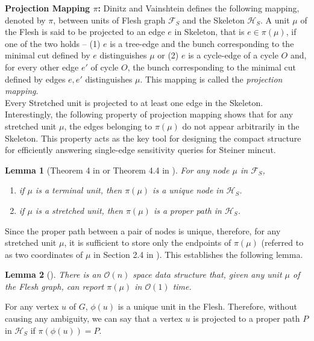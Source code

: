 \documentclass[letterpaper,11pt]{article}
\newtheorem{lemma}{Lemma}[]
\begin{document}
\noindent
\textbf{Projection Mapping $\pi$:} Dinitz and Vainshtein \cite{DBLP:journals/siamcomp/DinitzV00} defines the following mapping, denoted by $\pi$,  between units of Flesh graph ${\mathcal F}_S$ and the Skeleton ${\mathcal H}_S$.
A unit $\mu$ of the Flesh is said to be projected to an edge $e$ in Skeleton, that is $e\in \pi(\mu)$, if one of the two holds -- (1) $e$ is a tree-edge and the bunch corresponding to the minimal cut defined by $e$ distinguishes $\mu$ or (2) $e$ is a cycle-edge of a cycle $O$ and, for every other edge $e'$ of cycle $O$, the bunch corresponding to the minimal cut defined by edges $e,e'$ distinguishes $\mu$.  This mapping is called the \textit{projection mapping}. \\

\noindent
Every Stretched unit is projected to at least one edge in the Skeleton. Interestingly, the following property of projection mapping shows that for any stretched unit $\mu$, the edges belonging to $\pi(\mu)$ do not appear arbitrarily in the Skeleton. This property acts as the key tool for designing the compact structure \cite{DBLP:conf/soda/BaswanaP22} for efficiently answering single-edge sensitivity queries for Steiner mincut.
\begin{lemma} [Theorem 4 in \cite{DBLP:conf/stoc/DinitzV94} or Theorem 4.4 in \cite{DBLP:conf/soda/DinitzV95}] \label{lem : projection mapping of terminal and stretched units}
    For any node $\mu$ in ${\mathcal F}_S$, 
    \begin{enumerate}
        \item if $\mu$ is a terminal unit, then $\pi(\mu)$ is a unique node in ${\mathcal H}_S$. 
        \item if $\mu$ is a stretched unit, then $\pi(\mu)$ is a proper path in  ${\mathcal H}_S$. 
    \end{enumerate} 
\end{lemma}

\noindent
Since the proper path between a pair of nodes is unique, therefore, for any stretched unit $\mu$, it is sufficient to store only the endpoints of $\pi(\mu)$ (referred to as two coordinates of $\mu$ in Section 2.4 in \cite{DBLP:conf/stoc/DinitzV94}). This establishes the following lemma.
\begin{lemma} [\cite{DBLP:journals/siamcomp/DinitzV00, DBLP:conf/soda/DinitzV95, DBLP:conf/stoc/DinitzV94}] \label{lem : projection mapping}
    There is an ${\mathcal O}(n)$ space data structure that, given any unit $\mu$ of the Flesh graph, can report $\pi(\mu)$ in ${\mathcal O}(1)$ time. \end{lemma}
For any vertex $u$ of $G$, $\phi(u)$ is a unique unit in the Flesh. Therefore, without causing any ambiguity, we can say that a vertex $u$ is projected to a proper path $P$ in ${\mathcal H}_S$ if $\pi(\phi(u))=P$. \\
\end{document}
